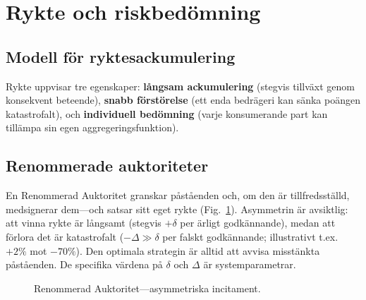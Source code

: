 \documentclass[11pt,a4paper,twocolumn]{article}
\begin{document}
\section{Rykte och riskbedömning}

\subsection{Modell för ryktesackumulering}

Rykte uppvisar tre egenskaper: \textbf{långsam ackumulering} (stegvis tillväxt genom konsekvent beteende), \textbf{snabb förstörelse} (ett enda bedrägeri kan sänka poängen katastrofalt), och \textbf{individuell bedömning} (varje konsumerande part kan tillämpa sin egen aggregeringsfunktion).

\subsection{Renommerade auktoriteter}

En Renommerad Auktoritet granskar påståenden och, om den är tillfredsställd, medsignerar dem---och satsar sitt eget rykte (Fig.~\ref{fig:authority}). Asymmetrin är avsiktlig: att vinna rykte är långsamt (stegvis $+\delta$ per ärligt godkännande), medan att förlora det är katastrofalt ($-\Delta \gg \delta$ per falskt godkännande; illustrativt t.ex. $+2\%$ mot $-70\%$). Den optimala strategin är alltid att avvisa misstänkta påståenden. De specifika värdena på $\delta$ och $\Delta$ är systemparametrar.

\begin{figure}[ht]
\centering
{}
\caption{Renommerad Auktoritet---asymmetriska incitament.}
\label{fig:authority}
\end{figure}
\end{document}
